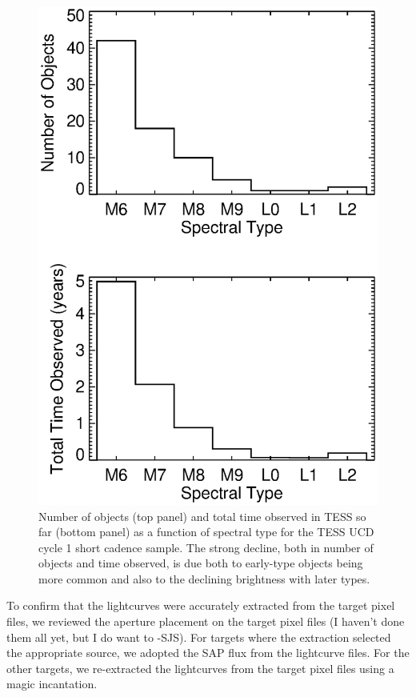 \documentclass[twocolumn]{aastex62}
\begin{document}
\begin{figure}
	\includegraphics[width=\columnwidth]{ST_stats.eps}
    \caption{Number of objects (top panel) and total time observed in TESS so far (bottom panel) as a function of spectral type for the TESS UCD cycle 1 short cadence sample. The strong decline, both in number of objects and time observed, is due both to early-type objects being more common and also to the declining brightness with later types.}
    \label{fig:ststat}
\end{figure}

To confirm that the lightcurves were accurately extracted from the target pixel files, we reviewed the aperture placement on the target pixel files (I haven't done them all yet, but I do want to -SJS). For targets where the extraction selected the appropriate source, we adopted the SAP flux from the lightcurve files. For the other targets, we re-extracted the lightcurves from the target pixel files using a magic incantation. 
\end{document}
